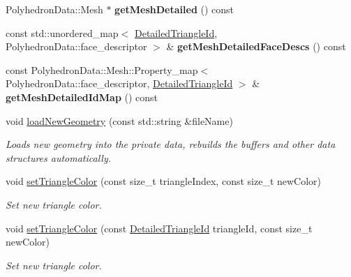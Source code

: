 \begin{DoxyCompactItemize}
\item 
\mbox{\label{classpepr3d_1_1_geometry_a81c9e23b272c99b9e1692ce1900c2b15}} 
Polyhedron\+Data\+::\+Mesh $\ast$ {\bfseries get\+Mesh\+Detailed} () const
\item 
\mbox{\label{classpepr3d_1_1_geometry_a90455dda02cab7e2affdda58966a831b}} 
const std\+::unordered\+\_\+map$<$ \mbox{\hyperlink{structpepr3d_1_1_detailed_triangle_id}{Detailed\+Triangle\+Id}}, Polyhedron\+Data\+::face\+\_\+descriptor $>$ \& {\bfseries get\+Mesh\+Detailed\+Face\+Descs} () const
\item 
\mbox{\label{classpepr3d_1_1_geometry_a586922a1b2662d6455bce899af40b6b2}} 
const Polyhedron\+Data\+::\+Mesh\+::\+Property\+\_\+map$<$ Polyhedron\+Data\+::face\+\_\+descriptor, \mbox{\hyperlink{structpepr3d_1_1_detailed_triangle_id}{Detailed\+Triangle\+Id}} $>$ \& {\bfseries get\+Mesh\+Detailed\+Id\+Map} () const
\item 
void \mbox{\hyperlink{classpepr3d_1_1_geometry_a027715ec109b060ffc8b420947c4fde0}{load\+New\+Geometry}} (const std\+::string \&file\+Name)
\begin{DoxyCompactList}\small\item\em Loads new geometry into the private data, rebuilds the buffers and other data structures automatically. \end{DoxyCompactList}\item 
void \mbox{\hyperlink{classpepr3d_1_1_geometry_aa473f80280346656024fc494994c065e}{set\+Triangle\+Color}} (const size\+\_\+t triangle\+Index, const size\+\_\+t new\+Color)
\begin{DoxyCompactList}\small\item\em Set new triangle color. \end{DoxyCompactList}\item 
\mbox{\label{classpepr3d_1_1_geometry_a0a8c000a3009ae4372ce223b27765ae6}} 
void \mbox{\hyperlink{classpepr3d_1_1_geometry_a0a8c000a3009ae4372ce223b27765ae6}{set\+Triangle\+Color}} (const \mbox{\hyperlink{structpepr3d_1_1_detailed_triangle_id}{Detailed\+Triangle\+Id}} triangle\+Id, const size\+\_\+t new\+Color)
\begin{DoxyCompactList}\small\item\em Set new triangle color. \end{DoxyCompactList}\item 

\end{DoxyCompactItemize}
